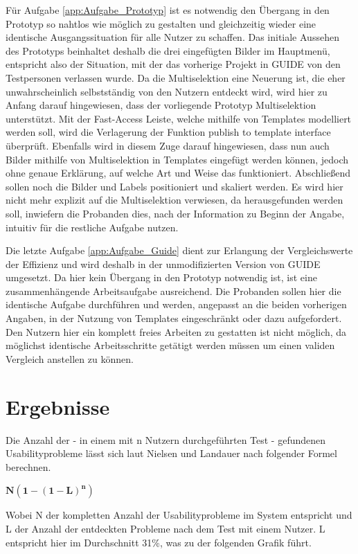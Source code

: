 Für Aufgabe \ref{app:Aufgabe_Prototyp} ist es notwendig den Übergang in den Prototyp so nahtlos wie möglich zu gestalten und gleichzeitig wieder eine identische Ausgangssituation für alle Nutzer zu schaffen.
Das initiale Aussehen des Prototyps beinhaltet deshalb die drei eingefügten Bilder im Hauptmenü, entspricht also der Situation, mit der das vorherige Projekt in GUIDE von den Testpersonen verlassen wurde.
Da die Multiselektion eine Neuerung ist, die eher unwahrscheinlich selbstständig von den Nutzern entdeckt wird, wird hier zu Anfang darauf hingewiesen, dass der vorliegende Prototyp Multiselektion unterstützt.
Mit der Fast-Access Leiste, welche mithilfe von Templates modelliert werden soll, wird die Verlagerung der Funktion \glqq publish to template interface\grqq{} überprüft.
Ebenfalls wird in diesem Zuge darauf hingewiesen, dass nun auch Bilder mithilfe von Multiselektion in Templates eingefügt werden können, jedoch ohne genaue Erklärung, auf welche Art und Weise das funktioniert.
Abschließend sollen noch die Bilder und Labels positioniert und skaliert werden.
Es wird hier nicht mehr explizit auf die Multiselektion verwiesen, da herausgefunden werden soll, inwiefern die Probanden dies, nach der Information zu Beginn der Angabe, intuitiv für die restliche Aufgabe nutzen.

Die letzte Aufgabe \ref{app:Aufgabe_Guide} dient zur Erlangung der Vergleichswerte der Effizienz und wird deshalb in der unmodifizierten Version von GUIDE umgesetzt.
Da hier kein Übergang in den Prototyp notwendig ist, ist eine zusammenhängende Arbeitsaufgabe ausreichend.
Die Probanden sollen hier die identische Aufgabe durchführen und werden, angepasst an die beiden vorherigen Angaben, in der Nutzung von Templates eingeschränkt oder dazu aufgefordert.
Den Nutzern hier ein komplett freies Arbeiten zu gestatten ist nicht möglich, da möglichst identische Arbeitsschritte getätigt werden müssen um einen validen Vergleich anstellen zu können.

\section {Ergebnisse}
Die Anzahl der - in einem mit n Nutzern durchgeführten Test -  gefundenen Usabilityprobleme lässt sich laut Nielsen und Landauer nach folgender Formel berechnen.

\begin{center}
$\mathbf{N (1-(1- L ) ^n )}$ 
\end{center}

Wobei N der kompletten Anzahl der Usabilityprobleme im System entspricht und L der Anzahl der entdeckten Probleme nach dem Test mit einem Nutzer.
L entspricht hier im Durchschnitt 31\%, was zu der folgenden Grafik führt.  \cite{Nielsen.1993}

